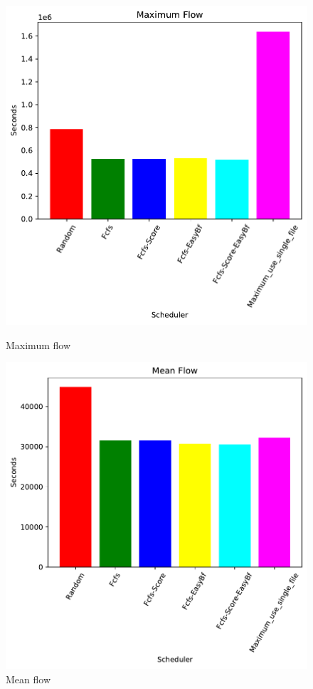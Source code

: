 	\begin{figure}[H]
	\begin{minipage}[b]{0.5\linewidth}\centering\includegraphics[width=1\linewidth]{MBSS/plot/2022-03-16_Maximum_flow450_128_32_256_4_1024.pdf}\caption{Maximum flow}\vspace{4ex}\end{minipage}
	\begin{minipage}[b]{0.5\linewidth}\centering\includegraphics[width=1\linewidth]{MBSS/plot/2022-03-16_Mean_flow450_128_32_256_4_1024.pdf}\caption{Mean flow}\vspace{4ex}\end{minipage} 

\end{figure}
